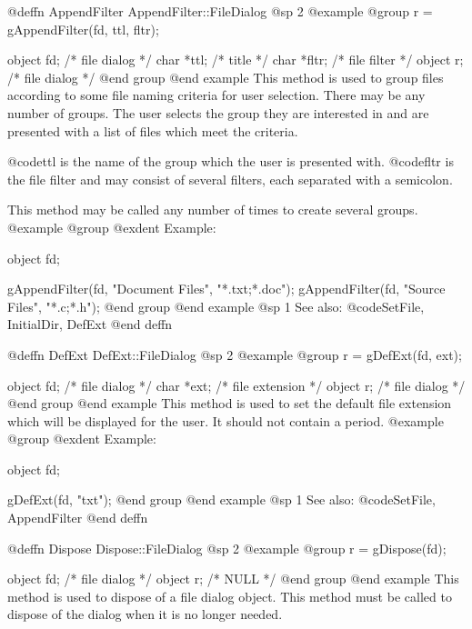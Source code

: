 @deffn {AppendFilter} AppendFilter::FileDialog
@sp 2
@example
@group
r = gAppendFilter(fd, ttl, fltr);

object  fd;     /*  file dialog  */
char    *ttl;   /*  title        */
char    *fltr;  /*  file filter  */
object  r;      /*  file dialog  */
@end group
@end example
This method is used to group files according to some file naming
criteria for user selection.  There may be any number of groups.  The
user selects the group they are interested in and are presented with
a list of files which meet the criteria.

@code{ttl} is the name of the group which the user is presented with.
@code{fltr} is the file filter and may consist of several filters,
each separated with a semicolon.

This method may be called any number of times to create several groups.
@example
@group
@exdent Example:

object  fd;

gAppendFilter(fd, "Document Files", "*.txt;*.doc");
gAppendFilter(fd, "Source Files", "*.c;*.h");
@end group
@end example
@sp 1
See also:  @code{SetFile, InitialDir, DefExt}
@end deffn














@deffn {DefExt} DefExt::FileDialog
@sp 2
@example
@group
r = gDefExt(fd, ext);

object  fd;     /*  file dialog     */
char    *ext;   /*  file extension  */
object  r;      /*  file dialog     */
@end group
@end example
This method is used to set the default file extension which will be
displayed for the user.  It should not contain a period.
@example
@group
@exdent Example:

object  fd;

gDefExt(fd, "txt");
@end group
@end example
@sp 1
See also:  @code{SetFile, AppendFilter}
@end deffn






@deffn {Dispose} Dispose::FileDialog
@sp 2
@example
@group
r = gDispose(fd);

object  fd;   /*  file dialog  */
object  r;    /*  NULL         */
@end group
@end example
This method is used to dispose of a file dialog object.  This method must
be called to dispose of the dialog when it is no longer needed.

